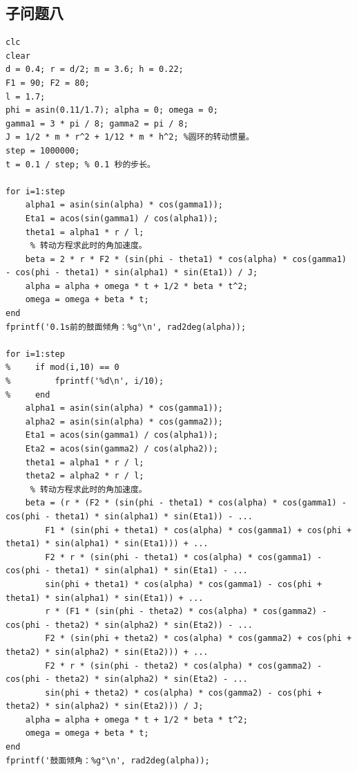 \documentclass{cumcm}
\begin{document}
\subsection{子问题八}
\begin{lstlisting}
clc
clear
d = 0.4; r = d/2; m = 3.6; h = 0.22;
F1 = 90; F2 = 80;
l = 1.7;
phi = asin(0.11/1.7); alpha = 0; omega = 0;
gamma1 = 3 * pi / 8; gamma2 = pi / 8;
J = 1/2 * m * r^2 + 1/12 * m * h^2; %圆环的转动惯量。
step = 1000000;
t = 0.1 / step; % 0.1 秒的步长。

for i=1:step
    alpha1 = asin(sin(alpha) * cos(gamma1));
    Eta1 = acos(sin(gamma1) / cos(alpha1));
    theta1 = alpha1 * r / l;
     % 转动方程求此时的角加速度。
    beta = 2 * r * F2 * (sin(phi - theta1) * cos(alpha) * cos(gamma1) - cos(phi - theta1) * sin(alpha1) * sin(Eta1)) / J;
    alpha = alpha + omega * t + 1/2 * beta * t^2;
    omega = omega + beta * t;
end
fprintf('0.1s前的鼓面倾角：%g°\n', rad2deg(alpha));

for i=1:step
%     if mod(i,10) == 0
%         fprintf('%d\n', i/10);
%     end
    alpha1 = asin(sin(alpha) * cos(gamma1));
    alpha2 = asin(sin(alpha) * cos(gamma2));
    Eta1 = acos(sin(gamma1) / cos(alpha1));
    Eta2 = acos(sin(gamma2) / cos(alpha2));
    theta1 = alpha1 * r / l;
    theta2 = alpha2 * r / l;
     % 转动方程求此时的角加速度。
    beta = (r * (F2 * (sin(phi - theta1) * cos(alpha) * cos(gamma1) - cos(phi - theta1) * sin(alpha1) * sin(Eta1)) - ...
        F1 * (sin(phi + theta1) * cos(alpha) * cos(gamma1) + cos(phi + theta1) * sin(alpha1) * sin(Eta1))) + ...
        F2 * r * (sin(phi - theta1) * cos(alpha) * cos(gamma1) - cos(phi - theta1) * sin(alpha1) * sin(Eta1) - ...
        sin(phi + theta1) * cos(alpha) * cos(gamma1) - cos(phi + theta1) * sin(alpha1) * sin(Eta1)) + ...
        r * (F1 * (sin(phi - theta2) * cos(alpha) * cos(gamma2) - cos(phi - theta2) * sin(alpha2) * sin(Eta2)) - ...
        F2 * (sin(phi + theta2) * cos(alpha) * cos(gamma2) + cos(phi + theta2) * sin(alpha2) * sin(Eta2))) + ...
        F2 * r * (sin(phi - theta2) * cos(alpha) * cos(gamma2) - cos(phi - theta2) * sin(alpha2) * sin(Eta2) - ...
        sin(phi + theta2) * cos(alpha) * cos(gamma2) - cos(phi + theta2) * sin(alpha2) * sin(Eta2))) / J;
    alpha = alpha + omega * t + 1/2 * beta * t^2;
    omega = omega + beta * t;
end
fprintf('鼓面倾角：%g°\n', rad2deg(alpha));
\end{lstlisting}
\end{document}

